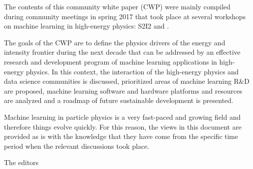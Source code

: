 The contents of this community white paper (CWP) were mainly compiled during community meetings in spring 2017 that took place at several workshops on machine learning in high-energy physics: S2I2 and \cite{DSatHEP2017,IML2017,ACAT2017,HSF2017}.

The goals of the CWP are to define the physics drivers of the energy and intensity frontier during the next decade that can be addressed by an effective research and development program of machine learning applications in high-energy physics. In this context, the interaction of the high-energy physics and data science communities is discussed, prioritized areas of machine learning R\&D are proposed, machine learning software and hardware platforms and resources are analyzed and a roadmap of future sustainable development is presented.

Machine learning in particle physics is a very fast-paced and growing field and therefore things evolve quickly. For this reason, the views in this document are provided as is with the knowledge that they have come from the specific time period when the relevant discussions took place.

\bigskip

The editors
